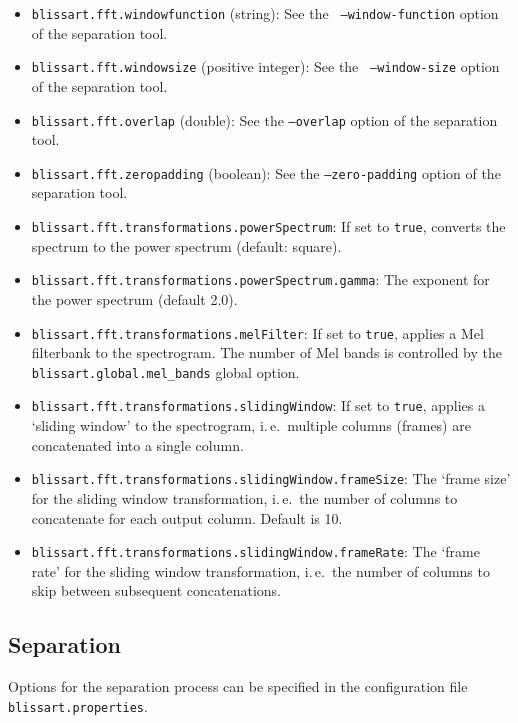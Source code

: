 \begin{itemize}
  \item {\tt blissart.fft.windowfunction} (string): See the {\tt
      --window-function} option of the separation tool.
  \item {\tt blissart.fft.windowsize} (positive integer): See the {\tt
      --window-size} option of the separation tool.
  \item {\tt blissart.fft.overlap} (double): See the {\tt --overlap} option of
    the separation tool.
  \item {\tt blissart.fft.zeropadding} (boolean): See the {\tt --zero-padding}
    option of the separation tool.
  \item {\tt blissart.fft.transformations.powerSpectrum}: 
        If set to {\tt true}, converts the spectrum to the power spectrum (default: square).
  \item {\tt blissart.fft.transformations.powerSpectrum.gamma}: 
        The exponent for the power spectrum (default 2.0).
  \item {\tt blissart.fft.transformations.melFilter}: 
        If set to {\tt true}, applies a Mel filterbank to the spectrogram.
        The number of Mel bands is controlled by the
        {\tt blissart.global.mel\_bands} global option.
  \item {\tt blissart.fft.transformations.slidingWindow}: 
        If set to {\tt true}, applies a `sliding window' to the spectrogram, i.\,e.\ multiple
        columns (frames) are concatenated into a single column.
  \item {\tt blissart.fft.transformations.slidingWindow.frameSize}: 
        The `frame size' for the sliding window transformation, i.\,e.\ the
        number of columns to concatenate for each output column. Default is 10.
  \item {\tt blissart.fft.transformations.slidingWindow.frameRate}: 
        The `frame rate' for the sliding window transformation, i.\,e.\ the
        number of columns to skip between subsequent concatenations.
\end{itemize}
 
  
\subsection{Separation}

Options for the separation process can be specified in the
configuration file {\tt blissart.properties}.

